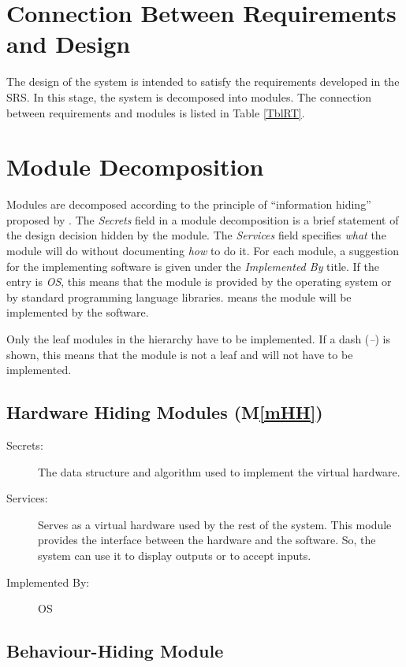 \documentclass[12pt, titlepage]{article}
\newcommand{\mref}[1]{M\ref{#1}}
\begin{document}
\section{Connection Between Requirements and Design} \label{SecConnection}

The design of the system is intended to satisfy the requirements developed in
the SRS. In this stage, the system is decomposed into modules. The connection
between requirements and modules is listed in Table \ref{TblRT}.


\section{Module Decomposition} \label{SecMD}

Modules are decomposed according to the principle of ``information hiding''
proposed by \citet{ParnasEtAl1984}. The \emph{Secrets} field in a module
decomposition is a brief statement of the design decision hidden by the
module. The \emph{Services} field specifies \emph{what} the module will do
without documenting \emph{how} to do it. For each module, a suggestion for the
implementing software is given under the \emph{Implemented By} title. If the
entry is \emph{OS}, this means that the module is provided by the operating
system or by standard programming language libraries.  \emph{\progname{}} means the
module will be implemented by the \progname{} software.

Only the leaf modules in the hierarchy have to be implemented. If a dash
(\emph{--}) is shown, this means that the module is not a leaf and will not have
to be implemented.

\subsection{Hardware Hiding Modules (\mref{mHH})}

\begin{description}
\item[Secrets:]The data structure and algorithm used to implement the virtual
  hardware.
\item[Services:]Serves as a virtual hardware used by the rest of the
  system. This module provides the interface between the hardware and the
  software. So, the system can use it to display outputs or to accept inputs.
\item[Implemented By:] OS
\end{description}

\subsection{Behaviour-Hiding Module}
\end{document}
